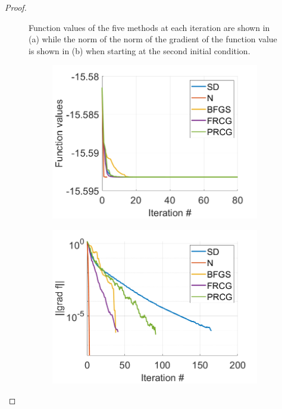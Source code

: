 \documentclass[12pt]{report}
\begin{document}
\begin{problem}
\begin{proof}
\begin{figure}[H]
\begin{subfigure}[b]{0.5\linewidth}
            \end{subfigure}
            \caption{Function values of the five methods at each iteration are shown in (a) while the norm of the norm of the gradient of the function value is shown in (b) when starting at the second initial condition.}
            \label{fig2}
        \end{figure}
        \begin{figure}[H]
            \begin{subfigure}[b]{0.5\linewidth}
                \centering
                \includegraphics[width=\linewidth]{images/3-funcval.png}
                \caption{}
                \label{fig3:a}
                \vspace{4ex}
            \end{subfigure}%
            \begin{subfigure}[b]{0.5\linewidth}
                \centering
                \includegraphics[width=\linewidth]{images/3-gradf.png}

\end{subfigure}
\end{figure}
\end{proof}
\end{problem}
\end{document}
